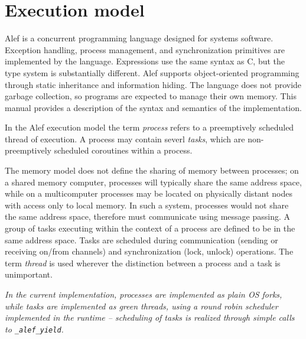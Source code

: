 \chapter{Execution model}

Alef is a concurrent programming language designed for
systems software. Exception handling, process management, and synchronization
primitives are implemented by the language. Expressions use the same syntax
as C, but the type system is substantially different. Alef supports object-oriented
programming through static inheritance and information hiding. The language does not
provide garbage collection, so programs are expected to manage their own memory.
This manual provides a description of the syntax and semantics of the
implementation.

\noindent
In the Alef execution model the term \textit{process} refers to a preemptively 
scheduled thread of execution. A process may contain severl \textit{tasks}, which 
are non-preemptively scheduled coroutines within a process. 

The memory model does not define the sharing of memory between processes; 
on a shared memory computer, processes will typically share the same address 
space, while on a multicomputer processes may be located on physically distant 
nodes with access only to local memory. In such a system, processes would not 
share the same address space, therefore must communicate using message passing. 
A group of tasks executing within the context of a process are defined to be 
in the same address space. Tasks are scheduled during communication (sending or 
receiving on/from channels) and synchronization (lock, unlock) operations. 
The term \textit{thread} is used wherever the distinction between a process and 
a task is unimportant. 

\textit{
In the current implementation, processes are implemented as plain OS forks, 
while tasks are implemented as green threads, using a round
robin scheduler implemented in the runtime -- scheduling of tasks is realized 
through simple calls to \texttt{\_alef\_yield}.}
